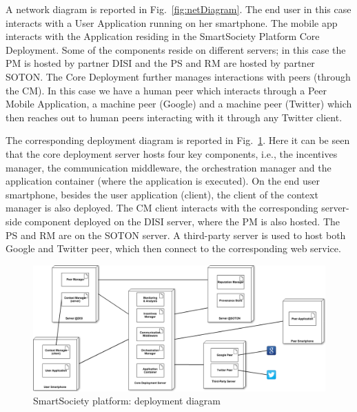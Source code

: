 A network diagram is reported in Fig.~\ref{fig:netDiagram}. The end user in this case interacts with a User Application running on her smartphone. The mobile app interacts with the Application residing in the SmartSociety Platform Core Deployment. Some of the components reside on different servers; in this case the PM is hosted by partner DISI and the PS and RM are hosted by partner SOTON. The Core Deployment further manages interactions with peers (through the CM). In this case we have a human peer which interacts through a Peer Mobile Application, a machine peer (Google) and a machine peer (Twitter) which then reaches out to human peers interacting with it through any Twitter client.



The corresponding deployment diagram is reported in Fig.~\ref{fig:deployDiagram}. Here it can be seen that the core deployment server hosts four key components, i.e., the incentives manager, the communication middleware, the orchestration manager and the application container (where the application is executed). On the end user smartphone, besides the user application (client), the client of the context manager is also  deployed. The CM client interacts with the corresponding server-side component deployed on the DISI server, where the PM is also hosted. The PS and RM are on the SOTON server. A third-party server is used to host both Google and Twitter peer, which then connect to the corresponding web service.
\begin{figure}
 \centering
 \includegraphics[width=1\textwidth]{figs/deploymentView}
 \caption{SmartSociety platform: deployment diagram}
 \label{fig:deployDiagram}
\end{figure}

